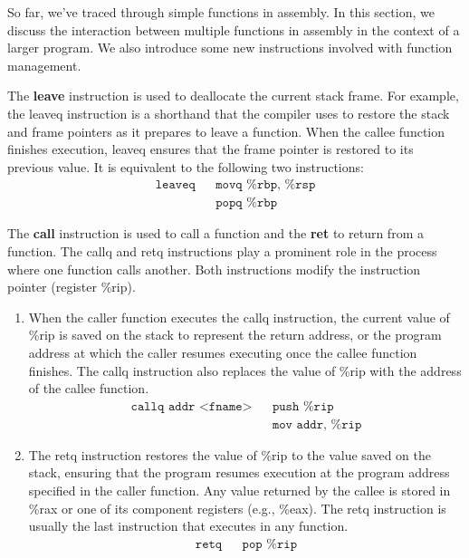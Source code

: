 \documentclass{article}
\begin{document}
  So far, we've traced through simple functions in assembly. In this section, we discuss the interaction between multiple functions in assembly in the context of a larger program. We also introduce some new instructions involved with function management. 

  \begin{definition}[Leave]
    The \textbf{leave} instruction is used to deallocate the current stack frame. For example, the leaveq instruction is a shorthand that the compiler uses to restore the stack and frame pointers as it prepares to leave a function. When the callee function finishes execution, leaveq ensures that the frame pointer is restored to its previous value. It is equivalent to the following two instructions: 
    \begin{align*}
      \texttt{leaveq} && \texttt{movq \%rbp, \%rsp} \\
                      && \texttt{popq \%rbp}
    \end{align*}
  \end{definition}

  \begin{definition}
    The \textbf{call} instruction is used to call a function and the \textbf{ret} to return from a function. The callq and retq instructions play a prominent role in the process where one function calls another. Both instructions modify the instruction pointer (register \%rip). 

    \begin{enumerate}
      \item When the caller function executes the callq instruction, the current value of \%rip is saved on the stack to represent the return address, or the program address at which the caller resumes executing once the callee function finishes. The callq instruction also replaces the value of \%rip with the address of the callee function. 
        \begin{align*}
          \texttt{callq addr <fname>} && \texttt{push \%rip} \\
                                      && \texttt{mov addr, \%rip}
        \end{align*}
      \item The retq instruction restores the value of \%rip to the value saved on the stack, ensuring that the program resumes execution at the program address specified in the caller function. Any value returned by the callee is stored in \%rax or one of its component registers (e.g., \%eax). The retq instruction is usually the last instruction that executes in any function.
        \begin{align*}
          \texttt{retq} && \texttt{pop \%rip} \\
        \end{align*}
    \end{enumerate}
  \end{definition}
\end{document}

